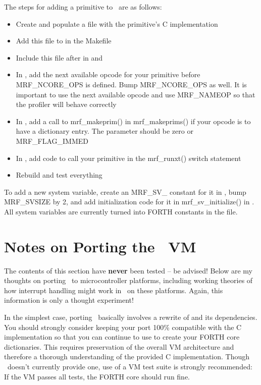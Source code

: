 \documentclass{article}
\begin{document}
The steps for adding a primitive to \M\ are as follows:
\begin{itemize}
\item Create and populate a file with the primitive's C implementation
\item Add this file to  in the Makefile
\item Include this file after  in  and
\item In , add the next available opcode for your
  primitive before MRF\_NCORE\_OPS is defined. Bump MRF\_NCORE\_OPS as
  well. It is important to use the next available opcode and use
  MRF\_NAMEOP so that the profiler will behave correctly
\item In , add a call to mrf\_makeprim() in
  mrf\_makeprims() if your opcode is to have a dictionary entry. The
   parameter should be zero or MRF\_FLAG\_IMMED
\item In , add code to call your primitive in the
  mrf\_runxt() switch statement
\item Rebuild and test everything
\end{itemize}
To add a new system variable, create an MRF\_SV\_ constant for it in
, bump MRF\_SVSIZE by 2, and add initialization code for
it in mrf\_sv\_initialize() in . All system
variables are currently turned into FORTH constants in the
 file.

\section*{Notes on Porting the \M\ VM}

The contents of this section have \textbf{never} been tested -- be
advised! Below are my thoughts on porting \M\ to microcontroller
platforms, including working theories of how interrupt handling might
work in \M\ on these platforms. Again, this information is only a
thought experiment!

In the simplest case, porting \M\ basically involves a rewrite of
 and its dependencies. You should strongly consider
keeping your port 100\% compatible with the C implementation so that
you can continue to use  to create your FORTH core
dictionaries.  This requires preservation of the overall VM
architecture and therefore a thorough understanding of the provided C
implementation. Though \M\ doesn't currently provide one, use of a VM
test suite is strongly recommended: If the VM passes all tests, the
FORTH core should run fine.
\end{document}
